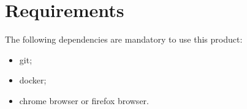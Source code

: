 \section{Requirements}

The following dependencies are mandatory to use this product:
\begin{itemize}
   \item git;
   \item docker;
   \item chrome browser or firefox browser.
\end{itemize}